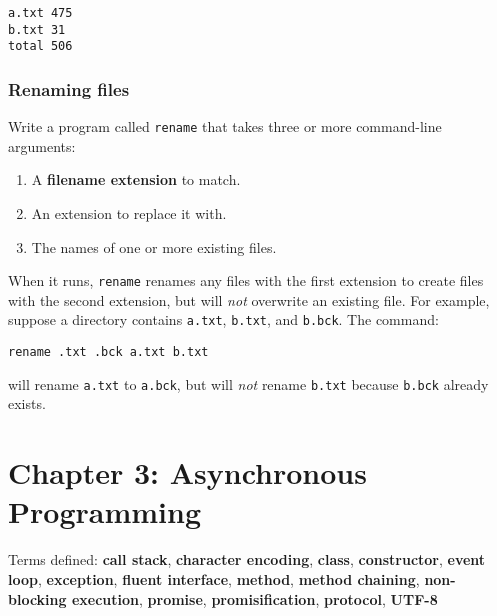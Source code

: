 \documentclass[krantzl]{krantz}
\newcommand{\glossref}[1]{\textbf{#1}}
\begin{document}
\begin{lstlisting}[frame=single,frameround=tttt]
a.txt 475
b.txt 31
total 506
\end{lstlisting}

\subsection*{Renaming files}


Write a program called \texttt{rename} that takes three or more command-line arguments:

\begin{enumerate}

\item A \glossref{filename extension} to match.

\item An extension to replace it with.

\item The names of one or more existing files.

\end{enumerate}


When it runs,
\texttt{rename} renames any files with the first extension to create files with the second extension,
but will \emph{not} overwrite an existing file.
For example,
suppose a directory contains \texttt{a.txt}, \texttt{b.txt}, and \texttt{b.bck}.
The command:

\begin{lstlisting}[frame=single,frameround=tttt]
rename .txt .bck a.txt b.txt
\end{lstlisting}


\noindent will rename \texttt{a.txt} to \texttt{a.bck},
but will \emph{not} rename \texttt{b.txt} because \texttt{b.bck} already exists.

\chapter{Chapter 3: Asynchronous Programming}\label{async-programming}


\noindent 
    Terms defined:
    \glossref{call stack}, \glossref{character encoding}, \glossref{class}, \glossref{constructor}, \glossref{event loop}, \glossref{exception}, \glossref{fluent interface}, \glossref{method}, \glossref{method chaining}, \glossref{non-blocking execution}, \glossref{promise}, \glossref{promisification}, \glossref{protocol}, \glossref{UTF-8}
\end{document}
